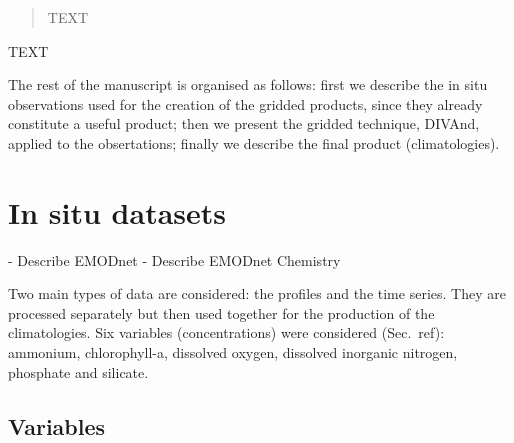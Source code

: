\documentclass[essd, manuscript]{copernicus}
\begin{document}
\begin{abstract}
TEXT
\end{abstract}


\introduction  %
TEXT

The rest of the manuscript is organised as follows: first we describe the in situ observations used for the creation of the gridded products, since they already constitute a useful product; then we present the gridded technique, DIVAnd, applied to the obsertations; finally we describe the final product (climatologies). 


\section{In situ datasets\label{sec:insitu}}

- Describe EMODnet \citep{MartinMiguez2019} 
- Describe EMODnet Chemistry \citep{Giorgetti2018}

Two main types of data are considered: the profiles and the time series. They are processed separately but then used together for the production of the climatologies. Six variables (concentrations) were considered (Sec.~ref{}): ammonium, chlorophyll-a, dissolved oxygen, dissolved inorganic nitrogen, phosphate and silicate.


%

\subsection{Variables}
\end{document}
